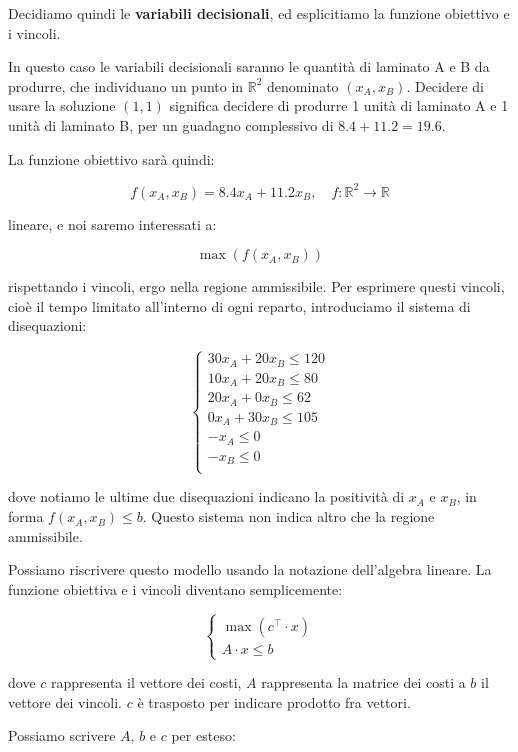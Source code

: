 \documentclass[a4paper,11pt]{article}
\begin{document}
Decidiamo quindi le \textbf{variabili decisionali}, ed esplicitiamo la funzione obiettivo e i vincoli.

In questo caso le variabili decisionali saranno le quantità di laminato A e B da produrre, che individuano un punto in $ \mathbb{R}^2 $ denominato $ ( x_A, x_B ) $. 
Decidere di usare la soluzione $ (1,1) $ significa decidere di produrre 1 unità di laminato A e 1 unità di laminato B, per un guadagno complessivo di $ 8.4 + 11.2 = 19.6 $.

La funzione obiettivo sarà quindi:

$$ f(x_A, x_B) = 8.4 x_A + 11.2 x_B, \quad f: \mathbb{R}^2 \rightarrow \mathbb{R} $$

lineare, e noi saremo interessati a:

$$ \max(f(x_A, x_B)) $$

rispettando i vincoli, ergo nella regione ammissibile.
Per esprimere questi vincoli, cioè il tempo limitato all'interno di ogni reparto, introduciamo il sistema di disequazioni:

\[
	\begin{cases}
		30 x_A + 20 x_B \leq 120 \\
		10 x_A + 20 x_B \leq 80	\\
		20 x_A + 0 x_B \leq 62 \\	
		0 x_A + 30 x_B \leq 105 \\
		- x_A \leq 0 \\
		- x_B \leq 0 \\
	\end{cases}
\]

dove notiamo le ultime due disequazioni indicano la positività di $x_A$ e $x_B$, in forma $ f(x_A, x_B) \leq b $.
Questo sistema non indica altro che la regione ammissibile.

Possiamo riscrivere questo modello usando la notazione dell'algebra lineare.
La funzione obiettiva e i vincoli diventano semplicemente:

\[
	\begin{cases}
		\max(c^\intercal \cdot x) \\
		A \cdot x \leq b	
	\end{cases}
\]

dove $c$ rappresenta il vettore dei costi, $A$ rappresenta la matrice dei costi a $b$ il vettore dei vincoli.
$c$ è trasposto per indicare prodotto fra vettori.

Possiamo scrivere $A$, $b$ e $c$ per esteso:
\end{document}

